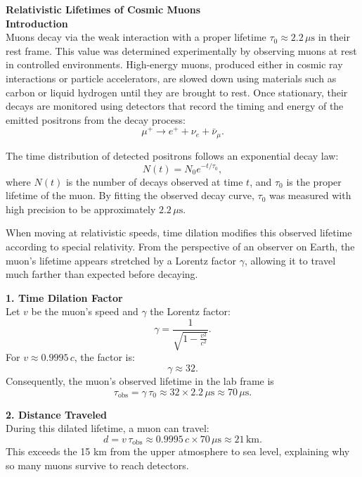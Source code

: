\begin{technical}
    {\Large\textbf{Relativistic Lifetimes of Cosmic Muons}}\\[0.7em]

    \noindent\textbf{Introduction}\\[0.5em]
    Muons decay via the weak interaction with a proper lifetime $\tau_0 \approx 2.2\,\mu\text{s}$ in their rest frame. This value was determined experimentally by observing muons at rest in controlled environments. High-energy muons, produced either in cosmic ray interactions or particle accelerators, are slowed down using materials such as carbon or liquid hydrogen until they are brought to rest. Once stationary, their decays are monitored using detectors that record the timing and energy of the emitted positrons from the decay process:
    \[
    \mu^+ \to e^+ + \nu_e + \bar{\nu}_\mu.
    \]
    
    The time distribution of detected positrons follows an exponential decay law:
    \[
    N(t) = N_0 e^{-t / \tau_0},
    \]
    where $N(t)$ is the number of decays observed at time $t$, and $\tau_0$ is the proper lifetime of the muon. By fitting the observed decay curve, $\tau_0$ was measured with high precision to be approximately $2.2\,\mu\text{s}$.
    
    When moving at relativistic speeds, time dilation modifies this observed lifetime according to special relativity. From the perspective of an observer on Earth, the muon's lifetime appears stretched by a Lorentz factor $\gamma$, allowing it to travel much farther than expected before decaying.
    
    \noindent\textbf{1. Time Dilation Factor}\\[0.5em]
    Let $v$ be the muon’s speed and $\gamma$ the Lorentz factor:
    \begin{equation}
        \gamma = \frac{1}{\sqrt{1 - \frac{v^2}{c^2}}}.
    \end{equation}
    For $v \approx 0.9995\,c$, the factor is:
    \[
        \gamma \approx 32.
    \]
    Consequently, the muon’s observed lifetime in the lab frame is
    \begin{equation}
        \tau_{\mathrm{obs}} = \gamma \,\tau_0 \approx 32 \times 2.2\,\mu\text{s} \approx 70\,\mu\text{s}.
    \end{equation}

    \noindent\textbf{2. Distance Traveled}\\[0.5em]
    During this dilated lifetime, a muon can travel:
    \begin{equation}
        d = v \,\tau_{\mathrm{obs}} 
          \approx 0.9995\,c \times 70\,\mu\text{s}
          \approx 21\,\text{km}.
    \end{equation}
    This exceeds the 15 km from the upper atmosphere to sea level, explaining why so many muons survive to reach detectors.


\end{technical}
